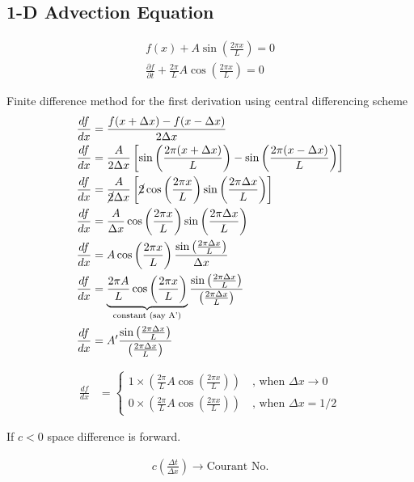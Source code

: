 \documentclass[fleqn,10pt]{SelfArx} %
\begin{document}
\subsection{1-D Advection Equation}
\begin{align*}
	f(x) + A \sin\left(\frac{2\pi x}{L}\right) = 0 \tag{19.1} \label{eq:19.1} \\
	\frac{\partial f}{\partial t} + \frac{2\pi}{L}A \cos\left(\frac{2\pi x}{L}\right)  = 0 \tag{19.2} \label{eq:19.2}
\end{align*}

Finite difference method for the first derivation using central differencing scheme
\begin{align*}
	\frac{df}{dx} &=\frac{f(x + \Delta x) - f(x - \Delta x)}{2\Delta x} \\
	\frac{df}{dx} &=\frac{A}{2\Delta x}\left[\sin\left(\frac{2\pi(x + \Delta x)}{L}\right) - \sin\left(\frac{2\pi(x - \Delta x)}{L}\right)\right] \\
	\frac{df}{dx} &=\frac{A}{\cancel{2}\Delta x}\left[\cancel{2}\cos\left(\frac{2\pi x}{L}\right)\sin\left(\frac{2\pi\Delta x}{L}\right)\right] \\
	\frac{df}{dx} &=\frac{A}{\Delta x}\cos\left(\frac{2\pi x}{L}\right)\sin\left(\frac{2\pi \Delta x}{L}\right) \\
	\frac{df}{dx} &=A\cos\left(\frac{2\pi x}{L}\right)\frac{\sin\left(\frac{2\pi\Delta x}{L}\right)}{\Delta x} \\
	\frac{df}{dx} &=\underbrace{\frac{2\pi A}{L}\cos\left(\frac{2\pi x}{L}\right)}_{\text{constant (say A')}} \frac{\sin\left(\frac{2\pi\Delta x}{L}\right)}{\left(\frac{2\pi\Delta x}{L}\right)} \\
	\frac{df}{dx} &=A'\frac{\sin\left(\frac{2\pi\Delta x}{L}\right)}{\left(\frac{2\pi\Delta x}{L}\right)}
\end{align*}

\begin{align*}
\frac{df}{dx} &=
	\begin{cases}
		1 \times \left(\frac{2\pi}{L}A\cos\left(\frac{2\pi x}{L}\right)\right) \quad \text{, when } \Delta x \rightarrow 0 \\
		0 \times \left(\frac{2\pi}{L}A\cos\left(\frac{2\pi x}{L}\right)\right) \quad \text{, when } \Delta x =1/2
	\end{cases}
\end{align*}

If \( c < 0 \) space difference is forward.

\begin{align*}
	c\left(\frac{\Delta t}{\Delta x}\right) \rightarrow \text{Courant No.}
\end{align*}
\end{document}
